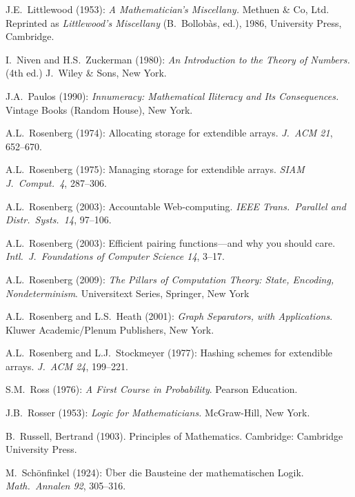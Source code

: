 \begin{thebibliography}{999}
J.E.~Littlewood (1953):
{\it A Mathematician's Miscellany.}
Methuen \& Co, Ltd.
Reprinted as {\it Littlewood's Miscellany} (B.~Bollob\`{a}s, ed.),
1986, University Press, Cambridge.





I.~Niven and H.S.~Zuckerman (1980):
{\it An Introduction to the Theory of Numbers.} (4th ed.)
J.~Wiley \& Sons, New York.



J.A.~Paulos (1990):
{\it Innumeracy: Mathematical Iliteracy and Its Consequences.}
Vintage Books (Random House), New York.



A.L.~Rosenberg (1974): Allocating storage for extendible arrays.  {\it
J.~ACM 21}, 652--670.

A.L.~Rosenberg (1975): Managing storage for extendible arrays.  {\it
SIAM J.~Comput.~4}, 287--306.

A.L.~Rosenberg (2003): Accountable Web-computing.  {\it IEEE
Trans.~Parallel and Distr.~Systs.~14}, 97--106.

A.L.~Rosenberg (2003): Efficient pairing functions---and why you
should care.  {\it Intl.~J.~Foundations of Computer Science 14},
3--17.

A.L.~Rosenberg (2009):
{\it The Pillars of Computation Theory: State, Encoding,
  Nondeterminism}.
Universitext Series, Springer, New York 

A.L.~Rosenberg and L.S.~Heath (2001):
{\it Graph Separators, with Applications}.
Kluwer Academic/Plenum Publishers, New York.

A.L.~Rosenberg and L.J.~Stockmeyer (1977): Hashing schemes for
extendible arrays.  {\it J.~ACM 24}, 199--221.

S.M.~Ross (1976):
{\it A First Course in Probability}.
Pearson Education.

J.B.~Rosser (1953):
{\it Logic for Mathematicians.}
McGraw-Hill, New York.

B.~Russell, Bertrand (1903). Principles of Mathematics. Cambridge:
Cambridge University Press. 



M.~Sch\"onfinkel (1924): \"{U}ber die Bausteine der mathematischen
Logik.  {\it Math.~Annalen 92}, 305--316.


\end{thebibliography}
